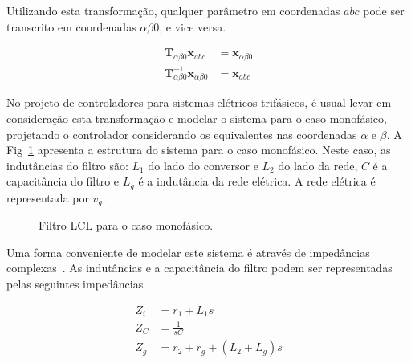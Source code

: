     Utilizando esta transformação, qualquer parâmetro em coordenadas $abc$ pode ser
    transcrito em coordenadas $\alpha \beta 0$, e vice versa.

    \begin{equation*}
        \begin{split}
            \mathbf{T}_{\alpha \beta 0} \mathbf{x}_{abc} & = \mathbf{x}_{\alpha \beta 0} \\
            \mathbf{T}_{\alpha \beta 0}^{-1} \mathbf{x}_{\alpha \beta 0} & = \mathbf{x}_{abc}
        \end{split}
    \end{equation*}

    No projeto de controladores para sistemas elétricos trifásicos, é usual levar em
    consideração esta transformação e modelar o sistema para o caso monofásico, projetando
    o controlador considerando os equivalentes nas coordenadas $\alpha$ e $\beta$. A
    Fig~\ref{fig:LCL_geral} apresenta a estrutura do sistema para o caso monofásico. Neste
    caso, as indutâncias do filtro são: $L_1$ do lado do conversor e $L_2$ do lado da rede,
    $C$ é a capacitância do filtro e $L_g$ é a indutância da rede elétrica. A rede elétrica
    é representada por $v_g$.

    \begin{figure}[htb]
        \renewcommand\figurename{Fig.}
        \caption{Filtro LCL para o caso monofásico.}
        \label{fig:LCL_geral}
    \end{figure}

    Uma forma conveniente de modelar este sistema é através de impedâncias
    complexas~\cite{ref:XU}. As indutâncias e a capacitância do filtro podem ser
    representadas pelas seguintes impedâncias

    \begin{equation}
        \begin{split}
            Z_i & = r_1 + L_1 s \\
            Z_C & = \frac{1}{s C} \\
            Z_g & = r_2 + r_g + \left( L_2 + L_g \right) s
        \end{split}
    \end{equation}

